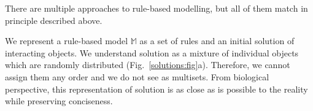 \documentclass[12pt]{fithesis2}
\begin{document}
There are multiple approaches to rule-based modelling, but all of them match in principle described above.

We represent a rule-based model $\mathds{M}$ as a set of rules and an initial solution of interacting objects. We understand solution as a mixture of individual objects which are randomly distributed (Fig.~\ref{solutions:fig}a). Therefore, we cannot assign them any order and we do not see as multisets. From biological perspective, this representation of solution is as close as is possible to the reality while preserving conciseness.

\begin{figure}[!h]
\begin{center}
\hspace*{1cm}

\end{center}
\end{figure}
\end{document}
